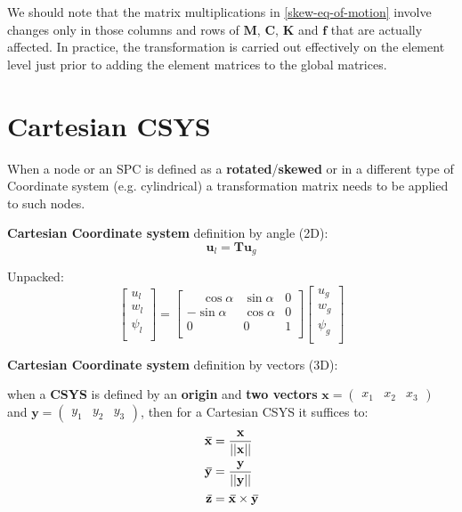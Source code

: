 \documentclass[10pt,b5paper,titlepage]{book}
\newcommand{\m}{\mathbf}
\newcommand{\closure}[2][3]{%
{}\mkern#1mu\overline{\mkern-#1mu#2}}
\newenvironment{eqarray}
{
    \begin{eqnarray}
        \begin{aligned}
}
{
        \end{aligned}
    \end{eqnarray}
}
\begin{document}
We should note that the matrix multiplications in \eqref{skew-eq-of-motion}
involve changes only in those columns and rows of $ \m{M} $, $ \m{C} $,
$ \m{K} $ and $ \m{f} $ that are actually affected. In practice,
the transformation is carried out effectively on the element level just prior
to adding the element matrices to the global matrices.


\newpage
\section{Cartesian CSYS}

When a node or an SPC is defined as a \textbf{rotated}/\textbf{skewed} or in
a different type of Coordinate system (e.g. cylindrical) a transformation matrix
needs to be applied to such nodes.

\textbf{Cartesian Coordinate system} definition by angle (2D):
\begin{equation}
    \m{u}_l = \m{T} \m{u}_g
\end{equation}

Unpacked:
\begin{equation}
    \begin{bmatrix}
        u_l \\
        w_l \\
        \psi_l \\
    \end{bmatrix}
    = \begin{bmatrix}
        \phantom{-}\cos \alpha & \sin \alpha & 0 \\
        -\sin \alpha & \cos \alpha & 0 \\
        0 & 0 & 1 \\
    \end{bmatrix}
    \begin{bmatrix}
        u_g \\
        w_g \\
        \psi_g \\
    \end{bmatrix}
\end{equation}



\textbf{Cartesian Coordinate system} definition by vectors (3D):

when a \textbf{CSYS} is defined by an \textbf{origin} and \textbf{two vectors}
$ \m{x} = \begin{pmatrix} x_1 & x_2 & x_3 \end{pmatrix} $
and $ \m{y} = \begin{pmatrix} y_1 & y_2 & y_3 \end{pmatrix} $,
then for a Cartesian CSYS it suffices to:
\begin{eqarray}
    \m{\closure{x}} &= \frac{\m{x}}{||\m{x}||} \\
    \m{\closure{y}} &= \frac{\m{y}}{||\m{y}||} \\
    \m{\closure{z}} &= \m{\closure{x}} \times \m{\closure{y}} \\
\end{eqarray}
\end{document}
